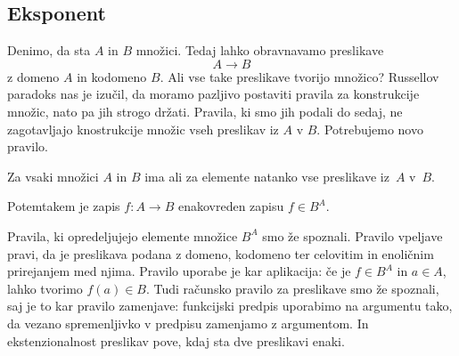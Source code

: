 




\subsection{Eksponent}
\label{sec:eksponent}

Denimo, da sta $A$ in $B$ množici. Tedaj lahko obravnavamo preslikave
%
\begin{equation*}
  A \to B
\end{equation*}
%
z domeno $A$ in kodomeno $B$. Ali vse take preslikave tvorijo množico? Russellov paradoks
nas je izučil, da moramo pazljivo postaviti pravila za konstrukcije množic, nato pa jih
strogo držati. Pravila, ki smo jih podali do sedaj, ne zagotavljajo knostrukcije množic
vseh preslikav iz $A$ v $B$. Potrebujemo novo pravilo.

\begin{pravilo}[Eksponent]
  Za vsaki množici $A$ in $B$ ima  ali  za
  elemente natanko vse preslikave iz~$A$ v~$B$.
\end{pravilo}

Potemtakem je zapis $f : A \to B$ enakovreden zapisu $f \in B^A$.

Pravila, ki opredeljujejo elemente množice $B^A$ smo že spoznali. Pravilo vpeljave pravi,
da je preslikava podana z domeno, kodomeno ter celovitim in enoličnim prirejanjem med
njima. Pravilo uporabe je kar aplikacija: če je $f \in B^A$ in $a \in A$, lahko tvorimo
$f(a) \in B$. Tudi računsko pravilo za preslikave smo že spoznali, saj je to kar pravilo
zamenjave: funkcijski predpis uporabimo na argumentu tako, da vezano spremenljivko v
predpisu zamenjamo z argumentom. In ekstenzionalnost preslikav pove, kdaj sta dve
preslikavi enaki.

